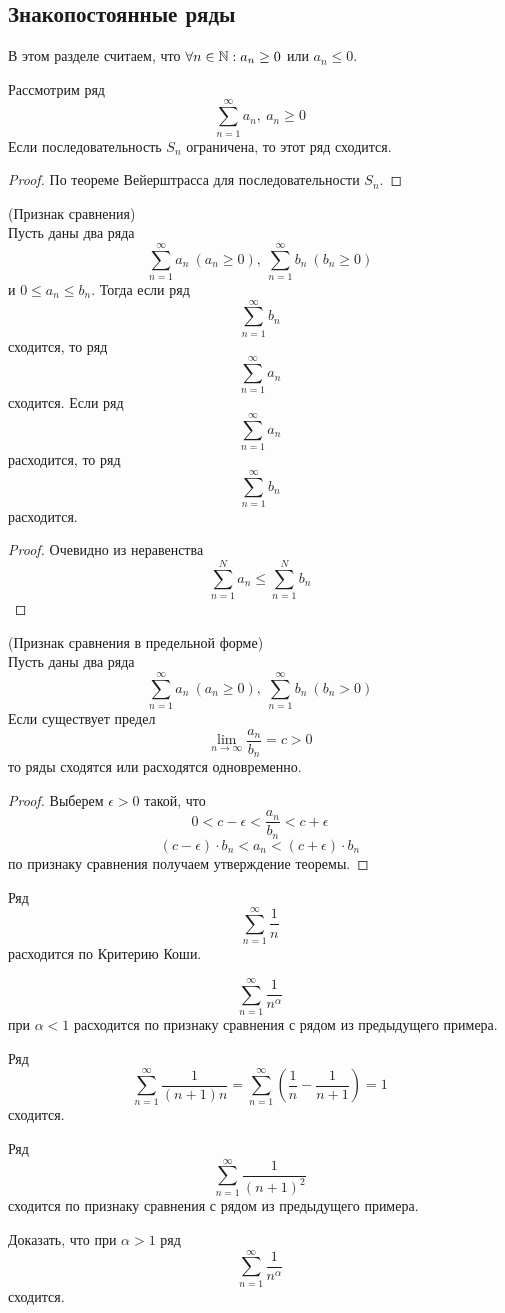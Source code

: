 \subsection{Знакопостоянные ряды}
В этом разделе считаем, что $\forall n\in \mathbb{N}: a_n\geq 0$ или $a_n\leq 0$.
\begin{theorem}
    Рассмотрим ряд
    \[\sum_{n=1}^{\infty}a_n,\ a_n\geq 0\]
    Если последовательность $S_n$ ограничена, то этот ряд сходится.
\end{theorem}
\begin{proof}
    По теореме Вейерштрасса для последовательности $S_n$.
\end{proof}
\begin{theorem} (Признак сравнения)\\
    Пусть даны два ряда
    \[\sum_{n=1}^{\infty}a_n\ (a_n\geq 0),\ \sum_{n=1}^{\infty}b_n\ (b_n\geq 0)\]
    и $0\leq a_n\leq b_n$. Тогда если ряд
    \[\sum_{n=1}^{\infty}b_n\]
    сходится, то ряд
    \[\sum_{n=1}^{\infty}a_n\]
    сходится. Если ряд
    \[\sum_{n=1}^{\infty}a_n\]
    расходится, то ряд
    \[\sum_{n=1}^{\infty}b_n\]
    расходится.
\end{theorem}
\begin{proof} Очевидно из неравенства
    \[\sum_{n=1}^{N}a_n\leq \sum_{n=1}^{N}b_n\]
\end{proof}
\begin{theorem} (Признак сравнения в предельной форме)\\
    Пусть даны два ряда
    \[\sum_{n=1}^{\infty}a_n\ (a_n\geq 0),\ \sum_{n=1}^{\infty}b_n\ (b_n > 0)\]
    Если существует предел
    \[\lim\limits_{n\to\infty}\frac{a_n}{b_n}=c>0\]
    то ряды сходятся или расходятся одновременно.
\end{theorem}
\begin{proof}
    Выберем $\epsilon>0$ такой, что
    \[0<c-\epsilon<\frac{a_n}{b_n}<c+\epsilon\]
    \[(c-\epsilon)\cdot b_n<a_n<(c+\epsilon)\cdot b_n\]
    по признаку сравнения получаем утверждение теоремы.
\end{proof}
\begin{example}
    Ряд
    \[\sum_{n=1}^{\infty}\frac{1}{n}\]
    расходится по Критерию Коши.
\end{example}
\begin{example}
    \[\sum_{n=1}^{\infty}\frac{1}{n^{\alpha}}\]
    при $\alpha<1$ расходится по признаку сравнения с рядом из предыдущего примера.
\end{example}
\begin{example} Ряд
    \[\sum_{n=1}^{\infty}\frac{1}{(n+1)n}=\sum_{n=1}^{\infty}\left(\frac{1}{n}-\frac{1}{n+1}\right)=1\]
    сходится.
\end{example}
\begin{example} Ряд
    \[\sum_{n=1}^{\infty}\frac{1}{(n+1)^2}\]
    сходится по признаку сравнения с рядом из предыдущего примера.
\end{example}
\begin{exercise} Доказать, что при $\alpha>1$ ряд
    \[\sum_{n=1}^{\infty}\frac{1}{n^{\alpha}}\]
    сходится.
\end{exercise}